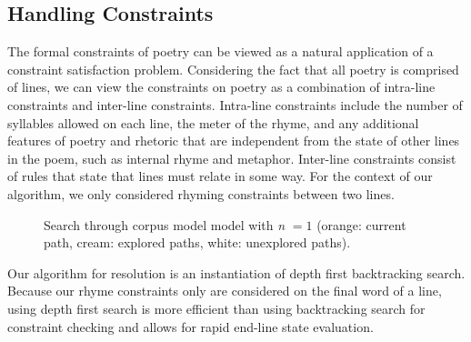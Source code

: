 \documentclass[10pt,twocolumn]{article}
\begin{document}
\subsection{Handling Constraints}
The formal constraints of poetry can be viewed as a natural application of a constraint satisfaction problem. Considering the fact that all poetry is comprised of lines, we can view the constraints on poetry as a combination of intra-line constraints and inter-line constraints. Intra-line constraints include the number of syllables allowed on each line, the meter of the rhyme, and any additional features of poetry and rhetoric that are independent from the state of other lines in the poem, such as internal rhyme and metaphor. Inter-line constraints consist of rules that state that lines must relate in some way. For the context of our algorithm, we only considered rhyming constraints between two lines.

\begin{figure}[t]
\caption{Search through corpus model model with \emph{n} $= 1$ (orange: current path, cream: explored paths, white: unexplored paths).}
\centering
{}
\end{figure}

Our algorithm for resolution is an instantiation of depth first backtracking search. Because our rhyme constraints only are considered on the final word of a line, using depth first search is more efficient than using backtracking search for constraint checking and allows for rapid end-line state evaluation.
\end{document}
